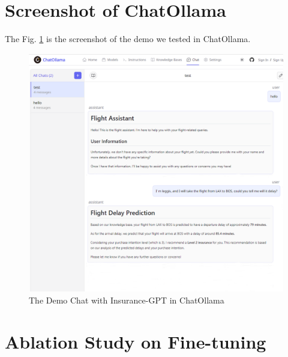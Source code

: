 \documentclass[conference]{IEEEtran}
\begin{document}
\section{Screenshot of ChatOllama}
The Fig. \ref{demo} is the screenshot of the demo we tested in ChatOllama.
\begin{figure}[h!]
    \centering
    \includegraphics[width=0.85\linewidth]{demo.png}
    \caption{The Demo Chat with Insurance-GPT in ChatOllama}
    \label{demo}
\end{figure}

\section{Ablation Study on Fine-tuning} \label{ablation}
\end{document}
